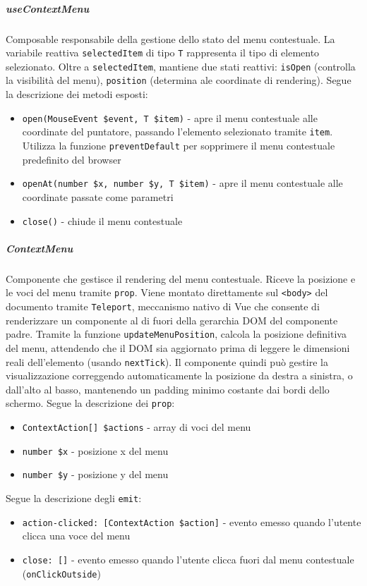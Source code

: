 \documentclass[a4paper,10pt]{article}
\begin{document}
\subparagraph{useContextMenu} Composable responsabile della gestione dello stato del menu contestuale. La variabile reattiva \texttt{selectedItem} di tipo \texttt{T} rappresenta il tipo di elemento selezionato. Oltre a \texttt{selectedItem}, mantiene due stati reattivi: \texttt{isOpen} (controlla la visibilità del menu), \texttt{position} (determina ale coordinate di rendering). Segue la descrizione dei metodi esposti:
\begin{itemize}
    \item \texttt{open(MouseEvent \$event, T \$item)} - apre il menu contestuale alle coordinate del puntatore, passando l'elemento selezionato tramite \texttt{item}. Utilizza la funzione \texttt{preventDefault} per sopprimere il menu contestuale predefinito del browser
    \item \texttt{openAt(number \$x, number \$y, T \$item)} - apre il menu contestuale alle coordinate passate come parametri
    \item \texttt{close()} - chiude il menu contestuale
\end{itemize}
\subparagraph{ContextMenu} Componente che gestisce il rendering del menu contestuale. Riceve la posizione e le voci del menu tramite \texttt{prop}. Viene montato direttamente sul \texttt{<body>} del documento tramite \texttt{Teleport}, meccanismo nativo di Vue che consente di renderizzare un componente al di fuori della gerarchia DOM del componente padre. Tramite la funzione \texttt{updateMenuPosition}, calcola la posizione definitiva del menu, attendendo che il DOM sia aggiornato prima di leggere le dimensioni reali dell'elemento (usando \texttt{nextTick}). Il componente quindi può gestire la visualizzazione correggendo automaticamente la posizione da destra a sinistra, o dall'alto al basso, mantenendo un padding minimo costante dai bordi dello schermo. Segue la descrizione dei \texttt{prop}:
\begin{itemize}
    \item \texttt{ContextAction[] \$actions} - array di voci del menu
    \item \texttt{number \$x} - posizione x del menu
    \item \texttt{number \$y} - posizione y del menu
\end{itemize}
Segue la descrizione degli \texttt{emit}:
\begin{itemize}
    \item \texttt{action-clicked: [ContextAction \$action]} - evento emesso quando l'utente clicca una voce del menu
    \item \texttt{close: []} - evento emesso quando l'utente clicca fuori dal menu contestuale (\texttt{onClickOutside})
\end{itemize}
\end{document}
